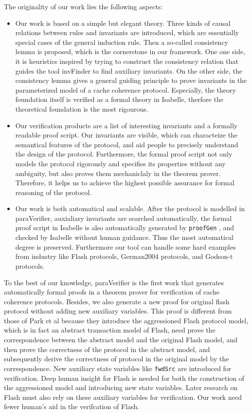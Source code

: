 \documentclass{llncs}
\begin{document}
The originality of our work lies the following aspects:
\begin{itemize}
\item Our work is based on a simple but elegant theory. Three kinds of causal
relations between rules and invariants are introduced, which are
essentially special cases of the general induction rule. Then a
so-called consistency lemma is proposed, which is the cornerstone in
our framework. One one side, it is heuristics inspired by trying to
construct the consistency relation that guides the tool {\sf
invFinder} to find auxiliary invariants. On the other side, the
consistency lemma gives a general guiding principle to prove
invariants  in the parameterized model of a cache coherence
protocol. Especially, the theory foundation itself is  verified as a
formal theory in Isabelle, therfore the theoretical foundation is
the most rigourous.

\item Our verification products are a list of interesting invariants
and a formally readable proof script. Our invariants are visible,
 which can characteize the semantical features of the protocol, and aid people to
   precisely
    understand the design of the protocol.
  Furthermore, the formal proof script not  only models the protocol
rigorously and specifies its properties without any ambiguity, but also
proves them mechaniclaly in the theorem prover. Therefore, it helps us to achieve the highest possible
assurance for formal reasoning of the protocol.

\item Our work is both automatical and scalable. After the protocol is modelled in {\sf paraVerifier}, auxialiary invariants
 are searched automatically,  the formal proof script in Isabelle is also  automatically generated by {\tt proofGen} , and   checked by Isabelle without human guidance. Thus the most automatical degree is preserved. Furthermore our tool can handle some hard examples from industry like Flash protocols, German2004 protocols, and Godson-t protocols.
\end{itemize}

To the best of our knowledge, {\sf paraVerifier} is the first work
that generates automatically formal proofs in a theorem prover for
verification of cache coherence protocols. Besides, we also generate a new
proof for original flash protocol without adding new auxiliary
variables. This proof is different from those of Park et al \cite{}
because  they introduce the aggressioned Flash protocol model, which
is in fact an abstract transaction model of Flash,   need prove
the correspondence between the abstract model and the original Flash
model, and then prove the correctness of the protocol in the abstract
model, and subsequently derive the correctness of protocol in the
original model by the correspondence. New   auxiliary state variables
like {\tt fwdSrc} are   introduced  for verification. Deep human insight for Flash is needed for both the construction of the aggressioned model  and  introducing new state variables.  Later research on Flash must also rely on these auxiliary
variables for verification. Our work need fewer human's aid in the verifcation of Flash.
\end{document}
